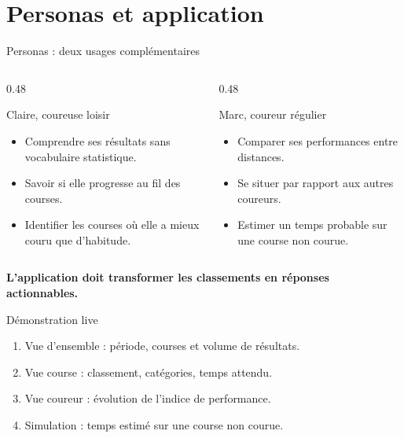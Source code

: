 \documentclass[aspectratio=169,11pt]{beamer}
\newcommand{\bigmessage}[1]{%
  \begin{center}
    \vspace{0.7cm}
    {\Large\bfseries\color{condruBlue} #1}
    \vspace{0.4cm}
  \end{center}
}
\begin{document}
\section{Personas et application}

\begin{frame}{Personas : deux usages complémentaires}
  \begin{columns}[T,onlytextwidth]
    \begin{column}{0.48\textwidth}
      \begin{block}{Claire, coureuse loisir}
        \begin{itemize}
          \item Comprendre ses résultats sans vocabulaire statistique.
          \item Savoir si elle progresse au fil des courses.
          \item Identifier les courses où elle a mieux couru que d'habitude.
        \end{itemize}
      \end{block}
    \end{column}
    \begin{column}{0.48\textwidth}
      \begin{block}{Marc, coureur régulier}
        \begin{itemize}
          \item Comparer ses performances entre distances.
          \item Se situer par rapport aux autres coureurs.
          \item Estimer un temps probable sur une course non courue.
        \end{itemize}
      \end{block}
    \end{column}
  \end{columns}
  \vspace{0.4cm}
  \bigmessage{L'application doit transformer les classements en réponses actionnables.}
\end{frame}

\begin{frame}{Démonstration live}

    \begin{enumerate}
      \item Vue d'ensemble : période, courses et volume de résultats.
      \item Vue course : classement, catégories, temps attendu.
      \item Vue coureur : évolution de l'indice de performance.
      \item Simulation : temps estimé sur une course non courue.
    \end{enumerate}

  \vspace{0.5cm}
\end{frame}
\end{document}
